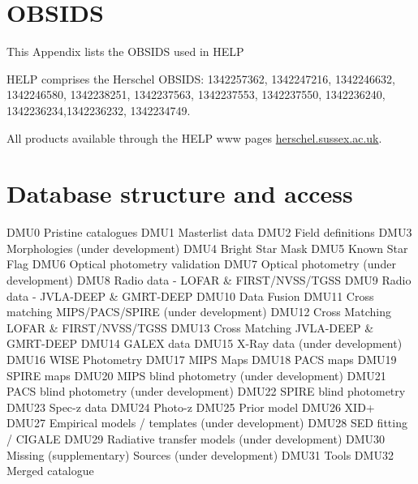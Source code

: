 \documentclass[usenatbib]{mnras}
\begin{document}


\section{OBSIDS}

This Appendix lists the OBSIDS used in HELP

HELP comprises the  Herschel OBSIDS: 1342257362, 1342247216,
1342246632, 1342246580, 1342238251, 1342237563, 1342237553, 1342237550,
1342236240, 1342236234,1342236232, 1342234749.

All products available through the HELP www pages \url{herschel.sussex.ac.uk}.


\section{Database structure and access}


DMU0	Pristine catalogues
DMU1	Masterlist data
DMU2	Field definitions
DMU3	Morphologies (under development)
DMU4	Bright Star Mask
DMU5	Known Star Flag
DMU6	Optical photometry validation
DMU7	Optical photometry (under development)
DMU8	Radio data - LOFAR & FIRST/NVSS/TGSS
DMU9	Radio data - JVLA-DEEP & GMRT-DEEP
DMU10	Data Fusion
DMU11	Cross matching MIPS/PACS/SPIRE (under development)
DMU12	Cross Matching LOFAR & FIRST/NVSS/TGSS
DMU13	Cross Matching JVLA-DEEP & GMRT-DEEP
DMU14	GALEX data
DMU15	X-Ray data (under development)
DMU16	WISE Photometry
DMU17	MIPS Maps
DMU18	PACS maps
DMU19	SPIRE maps
DMU20	MIPS blind photometry (under development)
DMU21	PACS blind photometry (under development)
DMU22	SPIRE blind photometry
DMU23	Spec-z data
DMU24	Photo-z
DMU25	Prior model
DMU26	XID+
DMU27	Empirical models / templates (under development)
DMU28	SED fitting / CIGALE
DMU29	Radiative transfer models (under development)
DMU30	Missing (supplementary) Sources (under development)
DMU31	Tools
DMU32	Merged catalogue



\end{document}

